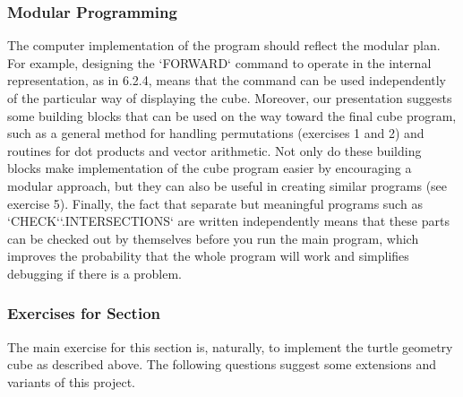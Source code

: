 \documentclass{book}
\begin{document}
\subsubsection{Modular Programming}

The computer implementation of the program should reflect the modular
plan. For example, designing the \textsc{`FORWARD`} command to operate in the
internal representation, as in 6.2.4, means that the command can be used
independently of the particular way of displaying the cube. Moreover,
our presentation suggests some building blocks that can be used on
the way toward the final cube program, such as a general method for
handling permutations (exercises 1 and 2) and routines for dot products
and vector arithmetic. Not only do these building blocks make implementation of the cube program easier by encouraging a modular approach, but they can also be useful in creating similar programs (see
exercise 5). Finally, the fact that separate but meaningful programs
such as \textsc{`CHECK`}\textsc{`.INTERSECTIONS`} are written independently means that
these parts can be checked out by themselves before you run the main
program, which improves the probability that the whole program will
work and simplifies debugging if there is a problem.

\subsubsection{Exercises for Section \thesection}

The main exercise for this section is, naturally, to implement the turtle
geometry cube as described above. The following questions suggest some
extensions and variants of this project.
\end{document}
